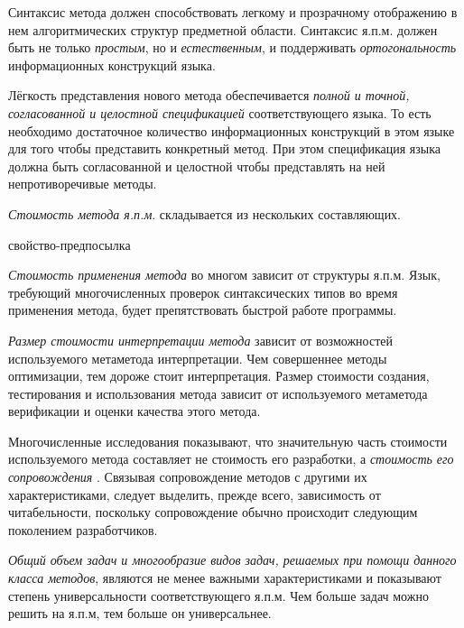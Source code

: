 Синтаксис метода должен способствовать легкому и прозрачному отображению в нем алгоритмических структур предметной области. Синтаксис я.п.м. должен быть не только \textit{простым}, но и \textit{естественным}, и поддерживать \textit{ортогональность} информационных конструкций языка.

Лёгкость представления нового метода обеспечивается\textit{ полной и точной, согласованной и целостной спецификацией} соответствующего языка. То есть необходимо достаточное количество информационных конструкций в этом языке для того чтобы представить конкретный метод. При этом спецификация языка должна быть согласованной и целостной чтобы представлять на ней непротиворечивые методы.

\textit{Стоимость метода я.п.м}. складывается из нескольких составляющих.

\begin{SCn}
\begin{scnrelfromlist}{свойство-предпосылка}
\end{scnrelfromlist}
\end{SCn}

\textit{Стоимость применения метода} во многом зависит от структуры я.п.м. Язык, требующий многочисленных проверок синтаксических типов во время применения метода, будет препятствовать быстрой работе программы.

\textit{Размер стоимости интерпретации метода} зависит от возможностей используемого метаметода интерпретации. Чем совершеннее методы оптимизации, тем дороже стоит интерпретация.
Размер стоимости создания, тестирования и использования метода зависит от используемого метаметода верификации и оценки качества этого метода.

Многочисленные исследования показывают, что значительную часть стоимости используемого метода составляет не стоимость его разработки, а \textit{стоимость его сопровождения} \cite{Brooks2021}. Связывая сопровождение методов с другими их характеристиками, следует выделить, прежде всего, зависимость от читабельности, поскольку сопровождение обычно происходит следующим поколением разработчиков.

\textit{Общий объем задач и многообразие видов задач, решаемых при помощи данного класса методов}, являются не менее важными характеристиками и показывают степень универсальности соответствующего я.п.м. Чем больше задач можно решить на я.п.м, тем больше он универсальнее.

